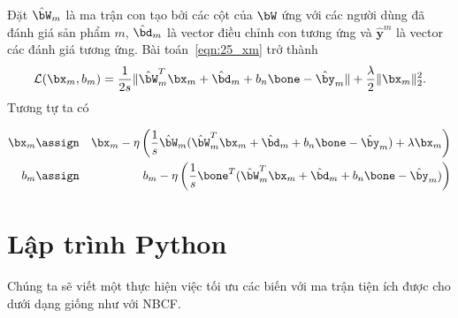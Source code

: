 Đặt $\hat{\bW}_m$ là ma trận con tạo bởi các cột của $\bW$ ứng
với các người dùng đã đánh giá sản phẩm $m$, $\hat{\bd}_m$ là vector điều chỉnh con
tương ứng và $\hat{\mathbf{y}}^m$ là vector các đánh giá tương ứng. Bài
toán~\eqref{eqn:25_xm} trở thành
\begin{equation} 
\mathcal{L}(\bx_m, b_m) 
 = \frac{1}{2s}\|\hat{\bW}_m^T\bx_m + \hat{\bd}_m + b_n\bone - \hat{\by}_m \| +
 \frac{\lambda}{2}\|\bx_m\|_2^2.
\end{equation} 
Tương tự ta có  

\begin{eqnarray}
    \bx_m &\assign & \bx_m -
    \eta\left(\frac{1}{s}\hat{\bW}_m(\hat{\bW}_m^T\bx_m + \hat{\bd}_m +
    b_n\bone - \hat{\by}_m) + \lambda\bx_m\right) \\
    b_m &\assign& b_m - \eta\left(\frac{1}{s}\bone^T(\hat{\bW}_m^T\bx_m + \hat{\bd}_m +
    b_n\bone - \hat{\by}_m)\right)
\end{eqnarray} 

\section{Lập trình Python }
Chúng ta sẽ viết một  thực hiện việc tối ưu
các biến với ma trận tiện ích được cho dưới dạng  giống
như với NBCF. 

